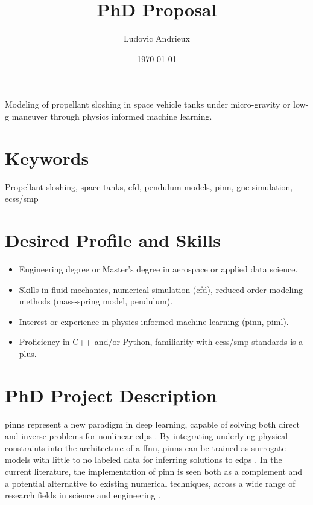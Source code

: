 \documentclass[12pt]{article}
\title{PhD Proposal}
\author{Ludovic Andrieux}
\date{\today}
\begin{document}
	\maketitle
	
	\begin{tcolorbox}[colback=gray!0, colframe=black, sharp corners, boxrule=0.5pt]
		Modeling of propellant sloshing in space vehicle tanks under micro-gravity or low-g maneuver through physics informed machine learning.
	\end{tcolorbox}
	
	\section*{Keywords}
	
	Propellant sloshing, space tanks, \acrshort{cfd}, pendulum models, \acrshort{pinn}, \acrshort{gnc} simulation, \acrshort{ecss}/\acrshort{smp}
	
	\section*{Desired Profile and Skills}
	
	\begin{itemize}
		\item Engineering degree or Master's degree in aerospace or applied data science.
		
		\item Skills in fluid mechanics, numerical simulation (\acrshort{cfd}), reduced-order modeling methods (mass-spring model, pendulum).
		
		\item Interest or experience in physics-informed machine learning (\acrshort{pinn}, \acrshort{piml}).
		
		\item Proficiency in C++ and/or Python, familiarity with \acrshort{ecss}/\acrshort{smp} standards is a plus.
	\end{itemize}
	
	\section*{PhD Project Description}
	
	\gls{pinn}s represent a new paradigm in deep learning, capable of solving both direct and inverse problems for nonlinear \gls{edp}s \cite{raissiPhysicsinformedNeuralNetworks2019}. By integrating underlying physical constraints into the architecture of a \gls{ffnn}, \gls{pinn}s can be trained as surrogate models with little to no labeled data for inferring solutions to \gls{edp}s \cite{cuomoScientificMachineLearning2022}. In the current literature, the implementation of \gls{pinn} is seen both as a complement and a potential alternative to existing numerical techniques, across a wide range of research fields in science and engineering \cite{maoPhysicsinformedNeuralNetworks2020, buosoPersonalisingLeftventricularBiophysical2021, caiPhysicsInformedNeuralNetworks2021}.
	
\end{document}
